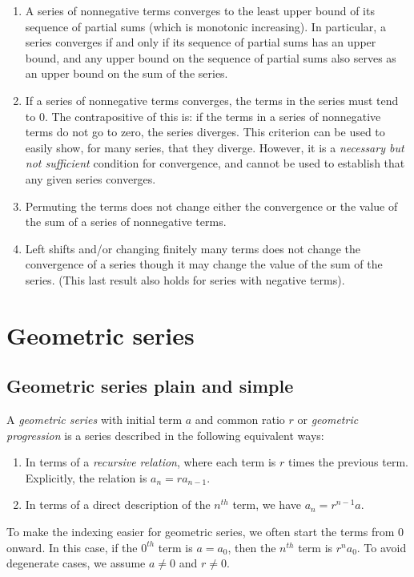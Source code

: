\documentclass{amsart}
\begin{document}
\begin{enumerate}
\item A series of nonnegative terms converges to the least upper bound
  of its sequence of partial sums (which is monotonic increasing). In
  particular, a series converges if and only if its sequence of
  partial sums has an upper bound, and any upper bound on the sequence
  of partial sums also serves as an upper bound on the sum of the
  series.
\item If a series of nonnegative terms converges, the terms in the
  series must tend to $0$. The contrapositive of this is: if the terms
  in a series of nonnegative terms do not go to zero, the series
  diverges. This criterion can be used to easily show, for many
  series, that they diverge. However, it is a {\em necessary but not
  sufficient} condition for convergence, and cannot be used to
  establish that any given series converges.
\item Permuting the terms does not change either the convergence or
  the value of the sum of a series of nonnegative terms.
\item Left shifts and/or changing finitely many terms does not change
  the convergence of a series though it may change the value of the
  sum of the series. (This last result also holds for series with
  negative terms).
\end{enumerate}

\section{Geometric series}

\subsection{Geometric series plain and simple}

A {\em geometric series} with initial term $a$ and common ratio $r$ or
{\em geometric progression} is a series described in the following
equivalent ways:

\begin{enumerate}
\item In terms of a {\em recursive relation}, where each term is $r$
  times the previous term. Explicitly, the relation is $a_n = ra_{n-1}$.
\item In terms of a direct description of the $n^{th}$ term, we have
  $a_n = r^{n-1}a$.
\end{enumerate}

To make the indexing easier for geometric series, we often start the
terms from $0$ onward. In this case, if the $0^{th}$ term is $a =
a_0$, then the $n^{th}$ term is $r^na_0$. To avoid degenerate cases,
we assume $a \ne 0$ and $r \ne 0$.
\end{document}
